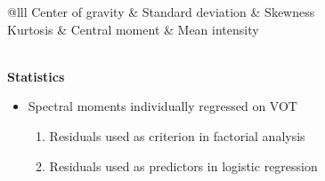 \documentclass[a0paper,portrait,columns=2]{baposter}
\begin{document}
\begin{poster}
{\begin{center}
	\begin{tabular}{@{}lll}
	\hline
	Center of gravity & Standard deviation & Skewness \\
	Kurtosis & Central moment & Mean intensity\\
	\hline
	\\
\end{tabular}
\end{center}

\textbf{Statistics}
\vspace{.05in} 

\begin{itemize}
	\item Spectral moments individually regressed on VOT
	\begin{enumerate}
		\item Residuals used as criterion in factorial analysis
		\item Residuals used as predictors in logistic regression
	\end{enumerate}
\end{itemize}


\vspace{.19in}

}







\end{poster}
\end{document}
